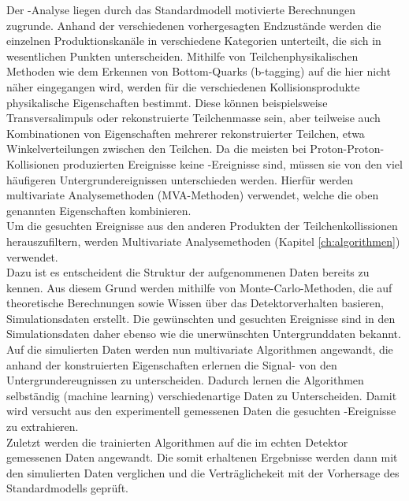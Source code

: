 Der \ttH-Analyse liegen durch das Standardmodell motivierte Berechnungen zugrunde. Anhand der verschiedenen vorhergesagten Endzust\"ande werden die einzelnen Produktionskan\"ale in verschiedene Kategorien unterteilt, die sich in wesentlichen Punkten unterscheiden. Mithilfe von Teilchenphysikalischen Methoden wie dem Erkennen von Bottom-Quarks (b-tagging) auf die hier nicht n\"aher eingegangen wird, werden f\"ur die verschiedenen Kollisionsprodukte physikalische Eigenschaften bestimmt. Diese k\"onnen beispielsweise Transversalimpuls oder rekonstruierte Teilchenmasse sein, aber teilweise auch Kombinationen von Eigenschaften mehrerer rekonstruierter Teilchen, etwa Winkelverteilungen zwischen den Teilchen. Da die meisten bei Proton-Proton-Kollisionen produzierten Ereignisse keine \ttH-Ereignisse sind, m\"ussen sie von den viel h\"aufigeren Untergrundereignissen unterschieden werden. Hierf\"ur werden multivariate Analysemethoden (MVA-Methoden) verwendet, welche die oben genannten Eigenschaften kombinieren.\\
Um die gesuchten Ereignisse aus den anderen Produkten der Teilchenkollissionen herauszufiltern, werden Multivariate Analysemethoden (Kapitel \ref{ch:algorithmen}) verwendet.\\
Dazu ist es entscheident die Struktur der aufgenommenen Daten bereits zu kennen. Aus diesem Grund werden mithilfe von Monte-Carlo-Methoden, die auf theoretische Berechnungen sowie Wissen \"uber das Detektorverhalten basieren, Simulationsdaten erstellt. Die gew\"unschten und gesuchten Ereignisse sind in den Simulationsdaten daher ebenso wie die unerw\"unschten Untergrunddaten bekannt. Auf die simulierten Daten werden nun multivariate Algorithmen angewandt, die anhand der konstruierten Eigenschaften erlernen die Signal- von den Untergrundereugnissen zu unterscheiden. Dadurch lernen die Algorithmen selbst\"andig (machine learning) verschiedenartige Daten zu Unterscheiden. Damit wird versucht aus den experimentell gemessenen Daten die gesuchten \ttH-Ereignisse zu extrahieren.\\
Zuletzt werden die trainierten Algorithmen auf die im echten Detektor gemessenen Daten angewandt. Die somit erhaltenen Ergebnisse werden dann mit den simulierten Daten verglichen und die Vertr\"aglichekeit mit der Vorhersage des Standardmodells gepr\"uft.
